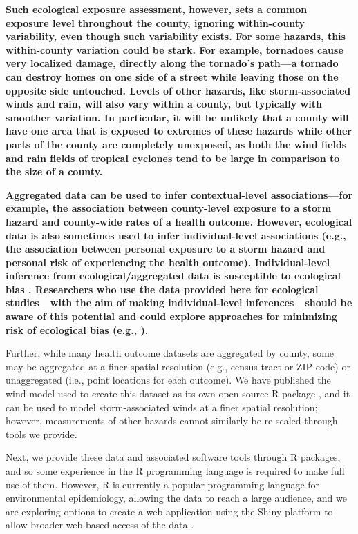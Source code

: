 \textbf{Such ecological exposure assessment, however, sets a common exposure
level throughout the county, ignoring within-county variability, even though
such variability exists. For some hazards, this within-county variation could
be stark. For example, tornadoes cause very localized damage, directly along
the tornado's path---a tornado can destroy homes on one side of a street while
leaving those on the opposite side untouched. Levels of other hazards, like
storm-associated winds and rain, will also vary within a county, but typically
with smoother variation. In particular, it will be unlikely that a county will
have one area that is exposed to extremes of these hazards while other parts of
the county are completely unexposed, as both the wind fields and rain fields of
tropical cyclones tend to be large in comparison to the size of a county.}

\textbf{Aggregated data can be used to infer contextual-level
associations---for example, the association between county-level exposure to a
storm hazard and county-wide rates of a health outcome. However, ecological
data is also sometimes used to infer individual-level associations (e.g., the
association between personal exposure to a storm hazard and personal risk of
experiencing the health outcome). Individual-level inference from
ecological/aggregated data is susceptible to ecological bias
\parencite{greenland1994invited, portnov2007ecological, idrovo2011three}.
Researchers who use the data provided here for ecological studies---with the
aim of making individual-level inferences---should be aware of this potential
and could explore approaches for minimizing risk of ecological bias (e.g.,
\cite{wakefield2008overcoming}).}

Further, while many health outcome datasets are aggregated by county, 
some may be aggregated at a finer spatial resolution (e.g., census tract or ZIP
code) or unaggregated (i.e., point locations for each outcome). We have
published the wind model used to create this dataset as its own open-source R
package \parencite{stormwindmodel}, and it can be used to model
storm-associated winds at a finer spatial resolution; however, measurements of
other hazards cannot similarly be re-scaled through tools we provide. 

Next, we provide these data and associated software tools through R packages,
and so some experience in the R programming language is required to make full
use of them. However, R is currently a popular programming language for
environmental epidemiology, allowing the data to reach a large audience, and we
are exploring options to create a web application using the Shiny platform to
allow broader web-based access of the data \parencite{shiny2019}.  

